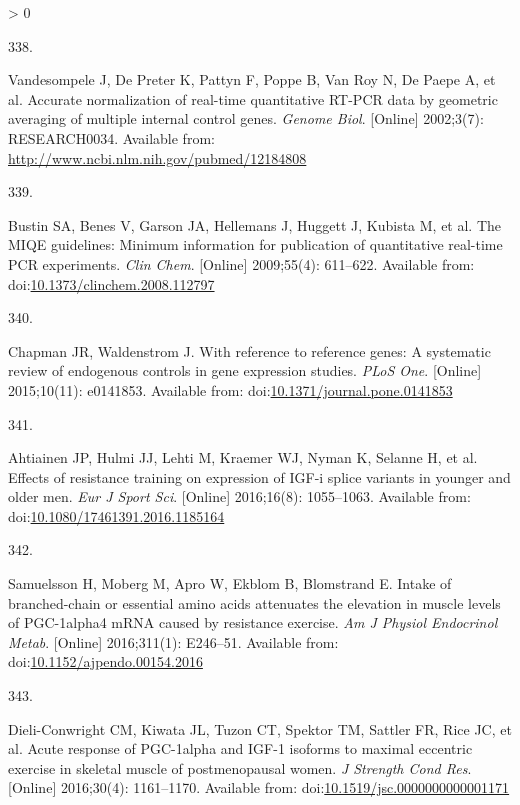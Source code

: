 \documentclass[twoside,10pt]{gihclass} %
\newlength{\cslhangindent}
\newlength{\csllabelwidth}
\newenvironment{CSLReferences}[3] %
 {%
  \setlength{\parindent}{0pt}
  \ifodd #1 \everypar{\setlength{\hangindent}{\cslhangindent}}\ignorespaces\fi
  \ifnum #2 > 0
  \setlength{\parskip}{#2\baselineskip}
  \fi
 }%
 {}
\newcommand{\CSLLeftMargin}[1]{\parbox[t]{\maxof{\widthof{#1}}{\csllabelwidth}}{#1}}
\newcommand{\CSLRightInline}[1]{\parbox[t]{\linewidth}{#1}}
\begin{document}
\begin{CSLReferences}{0}{0}
\leavevmode\hypertarget{ref-RN991}{}%
\CSLLeftMargin{338. }
\CSLRightInline{Vandesompele J, De Preter K, Pattyn F, Poppe B, Van Roy N, De Paepe A, et al. Accurate normalization of real-time quantitative RT-PCR data by geometric averaging of multiple internal control genes. \emph{Genome Biol}. {[}Online{]} 2002;3(7): RESEARCH0034. Available from: \url{http://www.ncbi.nlm.nih.gov/pubmed/12184808}}

\leavevmode\hypertarget{ref-RN1983}{}%
\CSLLeftMargin{339. }
\CSLRightInline{Bustin SA, Benes V, Garson JA, Hellemans J, Huggett J, Kubista M, et al. The MIQE guidelines: Minimum information for publication of quantitative real-time PCR experiments. \emph{Clin Chem}. {[}Online{]} 2009;55(4): 611--622. Available from: doi:\href{https://doi.org/10.1373/clinchem.2008.112797}{10.1373/clinchem.2008.112797}}

\leavevmode\hypertarget{ref-RN1985}{}%
\CSLLeftMargin{340. }
\CSLRightInline{Chapman JR, Waldenstrom J. With reference to reference genes: A systematic review of endogenous controls in gene expression studies. \emph{PLoS One}. {[}Online{]} 2015;10(11): e0141853. Available from: doi:\href{https://doi.org/10.1371/journal.pone.0141853}{10.1371/journal.pone.0141853}}

\leavevmode\hypertarget{ref-RN2083}{}%
\CSLLeftMargin{341. }
\CSLRightInline{Ahtiainen JP, Hulmi JJ, Lehti M, Kraemer WJ, Nyman K, Selanne H, et al. Effects of resistance training on expression of IGF-i splice variants in younger and older men. \emph{Eur J Sport Sci}. {[}Online{]} 2016;16(8): 1055--1063. Available from: doi:\href{https://doi.org/10.1080/17461391.2016.1185164}{10.1080/17461391.2016.1185164}}

\leavevmode\hypertarget{ref-RN2084}{}%
\CSLLeftMargin{342. }
\CSLRightInline{Samuelsson H, Moberg M, Apro W, Ekblom B, Blomstrand E. Intake of branched-chain or essential amino acids attenuates the elevation in muscle levels of PGC-1alpha4 mRNA caused by resistance exercise. \emph{Am J Physiol Endocrinol Metab}. {[}Online{]} 2016;311(1): E246--51. Available from: doi:\href{https://doi.org/10.1152/ajpendo.00154.2016}{10.1152/ajpendo.00154.2016}}

\leavevmode\hypertarget{ref-RN2086}{}%
\CSLLeftMargin{343. }
\CSLRightInline{Dieli-Conwright CM, Kiwata JL, Tuzon CT, Spektor TM, Sattler FR, Rice JC, et al. Acute response of PGC-1alpha and IGF-1 isoforms to maximal eccentric exercise in skeletal muscle of postmenopausal women. \emph{J Strength Cond Res}. {[}Online{]} 2016;30(4): 1161--1170. Available from: doi:\href{https://doi.org/10.1519/jsc.0000000000001171}{10.1519/jsc.0000000000001171}}


\end{CSLReferences}
\end{document}
